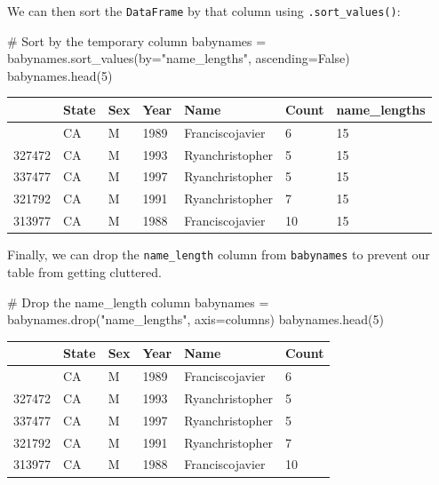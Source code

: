 \documentclass[
  letterpaper,
  DIV=11,
  numbers=noendperiod]{scrreprt}
\newenvironment{Shaded}{\begin{snugshade}}{\end{snugshade}}
\newcommand{\CommentTok}[1]{\textcolor[rgb]{0.37,0.37,0.37}{#1}}
\newcommand{\DecValTok}[1]{\textcolor[rgb]{0.68,0.00,0.00}{#1}}
\newcommand{\NormalTok}[1]{\textcolor[rgb]{0.00,0.23,0.31}{#1}}
\newcommand{\OperatorTok}[1]{\textcolor[rgb]{0.37,0.37,0.37}{#1}}
\newcommand{\StringTok}[1]{\textcolor[rgb]{0.13,0.47,0.30}{#1}}
\newcommand{\VariableTok}[1]{\textcolor[rgb]{0.07,0.07,0.07}{#1}}
\begin{document}
We can then sort the \texttt{DataFrame} by that column using
\texttt{.sort\_values()}:

\begin{Shaded}
\begin{Highlighting}[]
\CommentTok{\# Sort by the temporary column}
\NormalTok{babynames }\OperatorTok{=}\NormalTok{ babynames.sort\_values(by}\OperatorTok{=}\StringTok{"name\_lengths"}\NormalTok{, ascending}\OperatorTok{=}\VariableTok{False}\NormalTok{)}
\NormalTok{babynames.head(}\DecValTok{5}\NormalTok{)}
\end{Highlighting}
\end{Shaded}

\begin{longtable}[]{@{}lllllll@{}}
\toprule\noalign{}
& State & Sex & Year & Name & Count & name\_lengths \\
\midrule\noalign{}
\endhead
\bottomrule\noalign{}
\endlastfoot
316886 & CA & M & 1989 & Franciscojavier & 6 & 15 \\
327472 & CA & M & 1993 & Ryanchristopher & 5 & 15 \\
337477 & CA & M & 1997 & Ryanchristopher & 5 & 15 \\
321792 & CA & M & 1991 & Ryanchristopher & 7 & 15 \\
313977 & CA & M & 1988 & Franciscojavier & 10 & 15 \\
\end{longtable}

Finally, we can drop the \texttt{name\_length} column from
\texttt{babynames} to prevent our table from getting cluttered.

\begin{Shaded}
\begin{Highlighting}[]
\CommentTok{\# Drop the \textquotesingle{}name\_length\textquotesingle{} column}
\NormalTok{babynames }\OperatorTok{=}\NormalTok{ babynames.drop(}\StringTok{"name\_lengths"}\NormalTok{, axis}\OperatorTok{=}\StringTok{\textquotesingle{}columns\textquotesingle{}}\NormalTok{)}
\NormalTok{babynames.head(}\DecValTok{5}\NormalTok{)}
\end{Highlighting}
\end{Shaded}

\begin{longtable}[]{@{}llllll@{}}
\toprule\noalign{}
& State & Sex & Year & Name & Count \\
\midrule\noalign{}
\endhead
\bottomrule\noalign{}
\endlastfoot
316886 & CA & M & 1989 & Franciscojavier & 6 \\
327472 & CA & M & 1993 & Ryanchristopher & 5 \\
337477 & CA & M & 1997 & Ryanchristopher & 5 \\
321792 & CA & M & 1991 & Ryanchristopher & 7 \\
313977 & CA & M & 1988 & Franciscojavier & 10 \\
\end{longtable}
\end{document}
